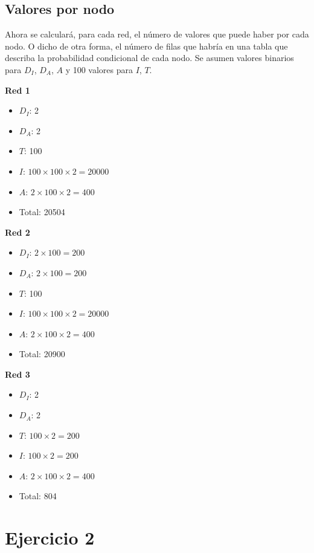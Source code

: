 \documentclass{article}
\begin{document}
\subsection{Valores por nodo}

Ahora se calculará, para cada red, el número de valores que puede haber por cada nodo. O dicho de otra forma, el número de filas que habría en una tabla que describa la probabilidad condicional de cada nodo. Se asumen valores binarios para $D_I$, $D_A$, $A$ y 100 valores para $I$, $T$.

\textbf{Red 1}

\begin{itemize}
\item $D_I$: 2
\item $D_A$: 2
\item $T$: 100
\item $I$: $100 \times 100 \times 2 = 20000$
\item $A$: $2 \times 100 \times 2 = 400$
\item Total: 20504
\end{itemize}

\textbf{Red 2}

\begin{itemize}
\item $D_I$: $2 \times 100 = 200$
\item $D_A$: $2 \times 100 = 200$
\item $T$: 100
\item $I$: $100 \times 100 \times 2 = 20000$
\item $A$: $2 \times 100 \times 2 = 400$
\item Total: 20900
\end{itemize}

\textbf{Red 3}

\begin{itemize}
\item $D_I$: 2
\item $D_A$: 2
\item $T$: $100 \times 2 = 200$
\item $I$: $100 \times 2 = 200$
\item $A$: $2 \times 100 \times 2 = 400$
\item Total: 804
\end{itemize}

\section{Ejercicio 2}
\end{document}
